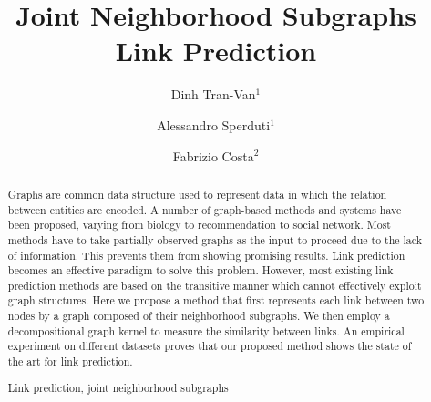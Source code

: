 \documentclass[runningheads,a4paper]{llncs}
\newcommand{\keywords}[1]{\par\addvspace\baselineskip
\noindent\keywordname\enspace\ignorespaces#1}
\begin{document}
\mainmatter  %

\title{Joint Neighborhood Subgraphs Link Prediction}


%
%
\author{Dinh Tran-Van$^1$ \and Alessandro Sperduti$^1$ \and Fabrizio Costa$^2$}
%


%
%

\maketitle


\begin{abstract}
Graphs are common data structure used to represent data in which the relation between entities are encoded. A number of graph-based methods and systems have been proposed, varying from biology to recommendation to social network. Most methods have to take partially observed graphs as the input to proceed due to the lack of information. This prevents them from showing promising results. Link prediction becomes an effective paradigm to solve this problem. However, most existing link prediction methods are based on the transitive manner which cannot effectively exploit graph structures. Here we propose a method that first represents each link between two nodes by a graph composed of their neighborhood subgraphs. We then employ a decompositional graph kernel to measure the similarity between links. An empirical experiment on different datasets proves that our proposed method shows the state of the art for link prediction.
\keywords{Link prediction, joint neighborhood subgraphs}
\end{abstract}
\end{document}

